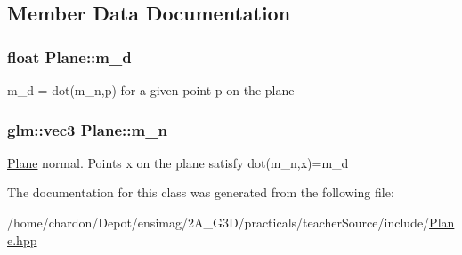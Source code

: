 \subsection{Member Data Documentation}
\hypertarget{classPlane_a5864bedfa1eb0ff017b89631fc7aff01}{
\subsubsection[{m\+\_\+d}]{\setlength{\rightskip}{0pt plus 5cm}float Plane\+::m\+\_\+d\hspace{0.3cm}{\ttfamily [private]}}}\label{classPlane_a5864bedfa1eb0ff017b89631fc7aff01}
m\+\_\+d = dot(m\+\_\+n,p) for a given point p on the plane \hypertarget{classPlane_a47fca7e21a0e825f754182692fad45b0}{
\subsubsection[{m\+\_\+n}]{\setlength{\rightskip}{0pt plus 5cm}glm\+::vec3 Plane\+::m\+\_\+n\hspace{0.3cm}{\ttfamily [private]}}}\label{classPlane_a47fca7e21a0e825f754182692fad45b0}
\hyperlink{classPlane}{Plane} normal. Points x on the plane satisfy dot(m\+\_\+n,x)=m\+\_\+d 

The documentation for this class was generated from the following file\+:\begin{DoxyCompactItemize}
\item 
/home/chardon/\+Depot/ensimag/2\+A\+\_\+\+G3\+D/practicals/teacher\+Source/include/\hyperlink{Plane_8hpp}{Plane.\+hpp}\end{DoxyCompactItemize}
